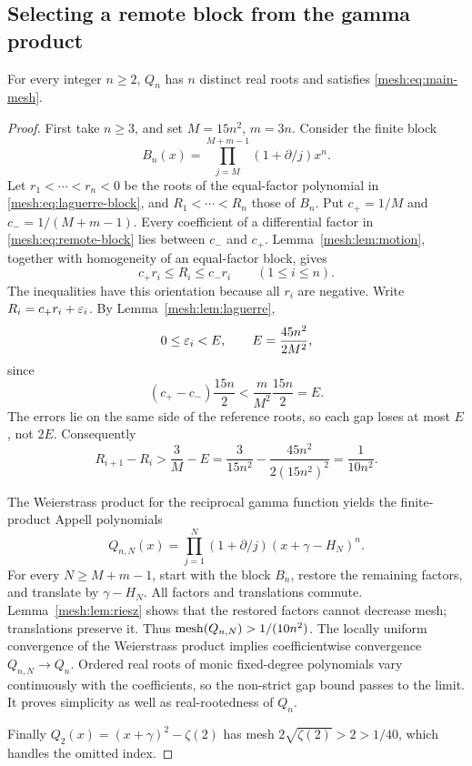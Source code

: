 \subsection{Selecting a remote block from the gamma product}

\begin{theorem}
\label{mesh:thm:polynomial}
For every integer $n\geq2$, $Q_n$ has $n$ distinct real roots and
satisfies \eqref{mesh:eq:main-mesh}.
\end{theorem}
\begin{proof}
First take $n\geq3$, and set $M=15n^2$, $m=3n$. Consider the finite
block
\begin{equation}\label{mesh:eq:remote-block}
 B_n(x)=\prod_{j=M}^{M+m-1}(1+\partial/j)x^n.
\end{equation}
Let $r_1<\cdots<r_n<0$ be the roots of the equal-factor polynomial
in \eqref{mesh:eq:laguerre-block}, and $R_1<\cdots<R_n$ those
of $B_n$. Put $c_+=1/M$ and $c_-=1/(M+m-1)$. Every coefficient
of a differential factor in \eqref{mesh:eq:remote-block} lies
between $c_-$ and $c_+$. Lemma~\ref{mesh:lem:motion}, together
with homogeneity of an equal-factor block, gives
\begin{equation}\label{mesh:eq:sandwich}
 c_+r_i\leq R_i\leq c_-r_i\qquad(1\leq i\leq n).
\end{equation}
The inequalities have this orientation because all $r_i$ are negative.
Write $R_i=c_+r_i+\varepsilon_i$. By Lemma~\ref{mesh:lem:laguerre},
\[
 0\leq\varepsilon_i< E,\qquad
 E=\frac{45n^2}{2M^2},
\]
since
\[
 (c_+-c_-)\frac{15n}{2}
 <\frac{m}{M^2}\frac{15n}{2}=E.
\]
The errors lie on the same side of the reference roots, so each gap
loses at most $E$, not $2E$. Consequently
\begin{equation}\label{mesh:eq:block-bound}
 R_{i+1}-R_i>\frac3M-E
 =\frac3{15n^2}-\frac{45n^2}{2(15n^2)^2}
 =\frac1{10n^2}.
\end{equation}

The Weierstrass product for the reciprocal gamma function yields the
finite-product Appell polynomials
\[
 Q_{n,N}(x)=\prod_{j=1}^N(1+\partial/j)(x+\gamma-H_N)^n.
\]
For every $N\geq M+m-1$, start with the block $B_n$, restore the
remaining factors, and translate by $\gamma-H_N$. All factors and
translations commute. Lemma~\ref{mesh:lem:riesz} shows that the
restored factors cannot decrease mesh; translations preserve it.
Thus $\operatorname{mesh}(Q_{n,N})>1/(10n^2)$.
The locally uniform convergence of the Weierstrass product implies
coefficientwise convergence $Q_{n,N}\to Q_n$. Ordered real roots
of monic fixed-degree polynomials vary continuously with the
coefficients, so the non-strict gap bound passes to the limit.
It proves simplicity as well as real-rootedness of $Q_n$.

Finally $Q_2(x)=(x+\gamma)^2-\zeta(2)$ has mesh
$2\sqrt{\zeta(2)}>2>1/40$, which handles the omitted index.
\end{proof}

